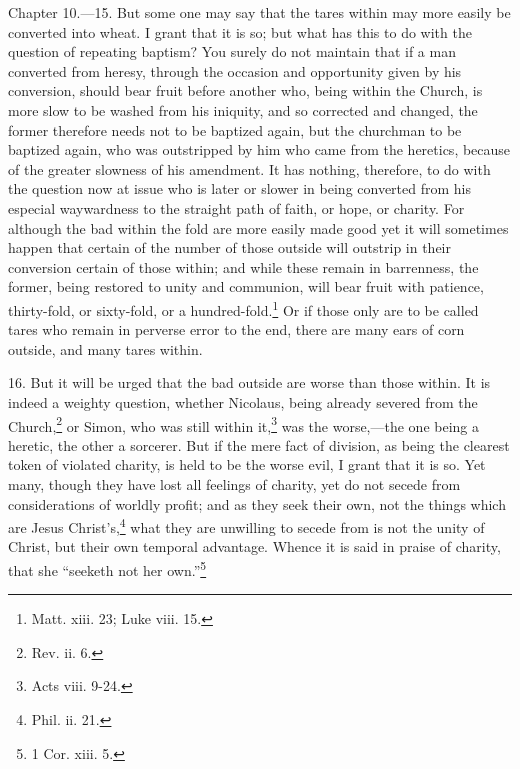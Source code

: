 
Chapter 10.—15. But some one may say that the tares within may more easily be converted into wheat. I grant that it is so; but what has this to do with the question of repeating baptism? You surely do not maintain that if a man converted from heresy, through the occasion and opportunity given by his conversion, should bear fruit before another who, being within the Church, is more slow to be washed from his iniquity, and so corrected and changed, the former therefore needs not to be baptized again, but the churchman to be baptized again, who was outstripped by him who came from the heretics, because of the greater slowness of his amendment. It has nothing, therefore, to do with the question now at issue who is later or slower in being converted from his especial waywardness to the straight path of faith, or hope, or charity. For although the bad within the fold are more easily made good yet it will sometimes happen that certain of the number of those outside will outstrip in their conversion certain of those within; and while these remain in barrenness, the former, being restored to unity and communion, will bear fruit with patience, thirty-fold, or sixty-fold, or a hundred-fold.\footnote{\par  Matt. xiii. 23; Luke viii. 15.} Or if those only are to be called tares who remain in perverse error to the end, there are many ears of corn outside, and many tares within.

16. But it will be urged that the bad outside are worse than those within. It is indeed a weighty question, whether Nicolaus, being already severed from the Church,\footnote{\par  Rev. ii. 6.} or Simon, who was still within it,\footnote{\par  Acts viii. 9-24.} was the worse,—the one being a heretic, the other a sorcerer. But if the mere fact of division, as being the clearest token of violated charity, is held to be the worse evil, I grant that it is so. Yet many, though they have lost all feelings of charity, yet do not secede from considerations of worldly profit; and as they seek their own, not the things which are Jesus Christ’s,\footnote{\par  Phil. ii. 21.} what they are unwilling to secede from is not the unity of Christ, but their own temporal advantage. Whence it is said in praise of charity, that she ``seeketh not her own.''\footnote{\par  1 Cor. xiii. 5.}

